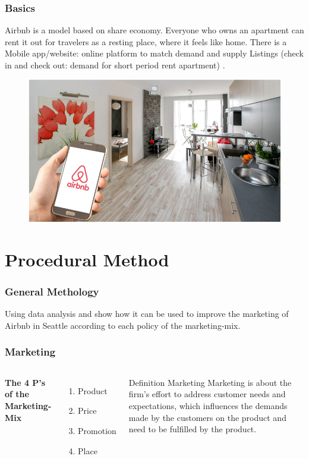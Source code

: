 \documentclass{beamer}
\begin{document}

\begin{frame}
\frametitle{Basics}
Airbnb is a model based on share economy. Everyone who owns an apartment can rent it out for travelers as a resting place, where it feels like home. There is a Mobile app/website: online platform to match demand and supply Listings (check in and check out: demand for short period rent apartment) .
\begin{figure}
\includegraphics[width=0.4\linewidth]{photo/basics1}
\end{figure}
\end{frame}

\section{Procedural Method}
\begin{frame}
\frametitle{General Methology}
Using data analysis and show how it can be used to improve the marketing of Airbnb in Seattle according to each policy of the marketing-mix.
\end{frame}
%
%
\begin{frame}
\frametitle{Marketing}
\begin{columns}[c] %

\textbf{The 4 P's of the Marketing-Mix}
\begin{enumerate}
\item Product
\item Price
\item Promotion
\item Place
\end{enumerate}


\begin{block}{Definition Marketing}
Marketing is about the firm’s effort to address customer needs and expectations, which influences the demands made by the customers on the product and need to be fulfilled by the product.\cite{Schierenbeck}
\end{block}
\end{columns}
\end{frame}
\end{document}

